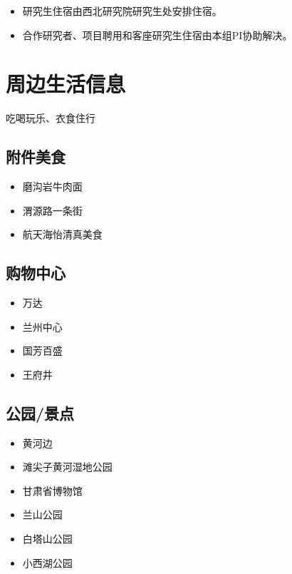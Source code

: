 \documentclass[
]{ctexbook}
\providecommand{\tightlist}{%
  \setlength{\itemsep}{0pt}\setlength{\parskip}{0pt}}
\begin{document}
\begin{itemize}
\tightlist
\item
  研究生住宿由西北研究院研究生处安排住宿。
\item
  合作研究者、项目聘用和客座研究生住宿由本组PI协助解决。
\end{itemize}

\hypertarget{life}{%
\section{周边生活信息}\label{life}}

吃喝玩乐、衣食住行

\hypertarget{ux9644ux4ef6ux7f8eux98df}{%
\subsection{附件美食}\label{ux9644ux4ef6ux7f8eux98df}}

\begin{itemize}
\tightlist
\item
  磨沟岩牛肉面
\item
  渭源路一条街
\item
  航天海怡清真美食
\end{itemize}

\hypertarget{ux8d2dux7269ux4e2dux5fc3}{%
\subsection{购物中心}\label{ux8d2dux7269ux4e2dux5fc3}}

\begin{itemize}
\tightlist
\item
  万达
\item
  兰州中心
\item
  国芳百盛
\item
  王府井
\end{itemize}

\hypertarget{ux516cux56edux666fux70b9}{%
\subsection{公园/景点}\label{ux516cux56edux666fux70b9}}

\begin{itemize}
\tightlist
\item
  黄河边
\item
  滩尖子黄河湿地公园
\item
  甘肃省博物馆
\item
  兰山公园
\item
  白塔山公园
\item
  小西湖公园
\end{itemize}
\end{document}
